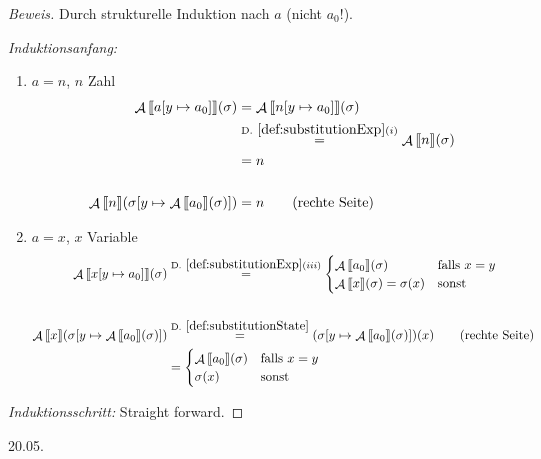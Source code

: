 \documentclass[a4paper,12pt]{article}
\theoremstyle{definition}
\theoremstyle{plain}
\theoremstyle{remark}
\newcommand{\lsem}{\mathrm{[}\kern-.14em\mathrm{[}}
\newcommand{\rsem}{\mathrm{]}\kern-.14em\mathrm{]}}
\newcommand{\defrefshort}[1]{\text{D.}~\ref{#1}}  %
\DeclareMathOperator{\A}{\mathcal{A}}
\begin{document}
\begin{proof}[Beweis]
    Durch strukturelle Induktion nach $a$ (nicht $a_0$!).

    \emph{Induktionsanfang:}
    \begin{enumerate}
        \item $a = n$, $n$ Zahl
            \begin{align*}
                \A\lsem a[y \mapsto a_0] \rsem(\sigma) & = \A\lsem n[y \mapsto a_0] \rsem(\sigma) \\
                & \overset{\defrefshort{def:substitutionExp}(i)}{=} \A\lsem n \rsem(\sigma) \\
                & = n \\
                \\
                \A\lsem n \rsem(\sigma[y \mapsto \A\lsem a_0 \rsem(\sigma)]) & = n \quad\quad \text{(rechte Seite)}
            \end{align*}

        \item $a = x$, $x$ Variable
            \begin{align*}
                \A\lsem x[y \mapsto a_0] \rsem(\sigma) & \overset{\defrefshort{def:substitutionExp}(iii)}{=} \begin{cases}
                    \A\lsem a_0 \rsem(\sigma) & \text{falls } x = y \\
                    \A\lsem x \rsem(\sigma) = \sigma(x) & \text{sonst}
                \end{cases} \\
                \\
                \A\lsem x \rsem(\sigma[y \mapsto \A\lsem a_0 \rsem(\sigma)]) & \overset{\defrefshort{def:substitutionState}}{=} (\sigma[y \mapsto \A\lsem a_0 \rsem(\sigma)])(x) \quad\quad \text{(rechte Seite)} \\
                & = \begin{cases}
                    \A\lsem a_0 \rsem(\sigma) & \text{falls } x = y \\
                    \sigma(x) & \text{sonst}
                \end{cases}
            \end{align*}
    \end{enumerate}

    \emph{Induktionsschritt:} Straight forward.
\end{proof}



\newpage
\hfill 20.05.
\end{document}
